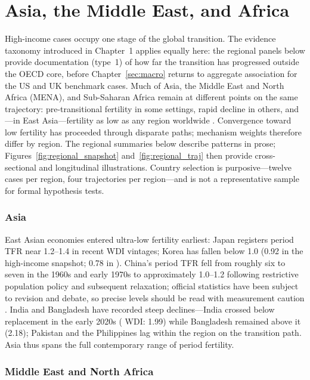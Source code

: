 \documentclass[11pt,a4paper,openany]{book}
\begin{document}
\FloatBarrier
\chapter{Asia, the Middle East, and Africa}
\label{sec:regional}

High-income cases occupy one stage of the global transition. The evidence taxonomy introduced in Chapter~1 applies equally here: the regional panels below provide documentation (type~1) of how far the transition has progressed outside the OECD core, before Chapter~\ref{sec:macro} returns to aggregate association for the US and UK benchmark cases. Much of Asia, the Middle East and North Africa (MENA), and Sub-Saharan Africa remain at different points on the same trajectory: pre-transitional fertility in some settings, rapid decline in others, and---in East Asia---fertility as low as any region worldwide \citep{frejka2017}. Convergence toward low fertility has proceeded through disparate paths; mechanism weights therefore differ by region. The regional summaries below describe patterns in prose; Figures~\ref{fig:regional_snapshot} and~\ref{fig:regional_traj} then provide cross-sectional and longitudinal illustrations. Country selection is purposive---twelve cases per region, four trajectories per region---and is not a representative sample for formal hypothesis tests.

\subsection*{Asia}

East Asian economies entered ultra-low fertility earliest: Japan registers period TFR near 1.2--1.4 in recent WDI vintages; Korea has fallen below 1.0 (0.92 in the \SnapshotYear{} high-income snapshot; 0.78 in \RegionalYear{}). China's period TFR fell from roughly six to seven in the 1960s and early 1970s to approximately 1.0--1.2 following restrictive population policy and subsequent relaxation; official statistics have been subject to revision and debate, so precise levels should be read with measurement caution \citep{frejka2017}. India and Bangladesh have recorded steep declines---India crossed below replacement in the early 2020s (\RegionalYear{} WDI: 1.99) while Bangladesh remained above it (2.18); Pakistan and the Philippines lag within the region on the transition path. Asia thus spans the full contemporary range of period fertility.

\subsection*{Middle East and North Africa}
\end{document}
